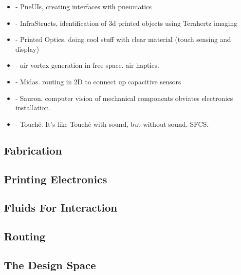 \begin{itemize}
\item \cite{Yao-pneui} - PneUIs, creating interfaces with pneumatics
\item \cite{Willis-infrastructs} - InfraStructs, identification of 3d printed objects using Terahertz imaging
\item \cite{Willis-printedoptics} - Printed Optics.  doing cool stuff with clear material (touch sensing and display)
\item \cite{Sodhi-aireal} - air vortex generation in free space.  air haptics.
\item \cite{Savage-midas} - Midas.  routing in 2D to connect up capacitive sensors
\item \cite{Savage-sauron} - Sauron.  computer vision of mechanical components obviates electronics installation.
\item \cite{Sato-touche} - Touch\'{e}.  It's like Touch\'{e} with sound, but without sound.  SFCS.
\end{itemize}

\subsection{Fabrication}

\subsection{Printing Electronics}

\subsection{Fluids For Interaction}

\subsection{Routing}

\subsection{The Design Space}

